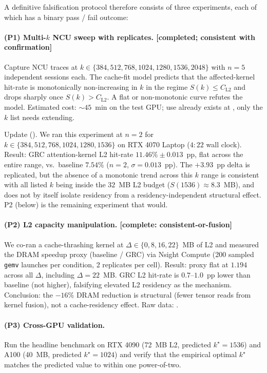 \documentclass[11pt]{article}
\begin{document}
A definitive falsification protocol therefore consists of three
experiments, each of which has a binary pass / fail outcome:

\paragraph{(P1) Multi-$k$ NCU sweep with replicates. [completed; consistent with confirmation]}
Capture NCU traces at $k\in\{384, 512, 768, 1024, 1280, 1536, 2048\}$
with $n{=}5$ independent sessions each. The cache-fit model predicts
that the affected-kernel hit-rate is monotonically non-increasing in $k$
in the regime $S(k)\le C_\text{L2}$ and drops sharply once
$S(k)>C_\text{L2}$. A flat or non-monotonic curve refutes the model.
Estimated cost: ${\sim}45$~min on the test GPU; use already exists at
, only the $k$ list needs
extending.

\smallskip\noindent Update ().
We ran this experiment at $n{=}2$ for $k\in\{384,512,768,1024,1280,1536\}$
on RTX 4070 Laptop ($4{:}22$ wall clock). Result: GRC attention-kernel
L2 hit-rate $11.46\%\pm 0.013$~pp, flat across the entire range, vs.\
baseline $7.54\%$ ($n{=}2$, $\sigma{=}0.013$~pp). The $+3.93$~pp delta
is replicated, but the absence of a monotonic trend across this $k$ range
is consistent with all listed $k$ being inside the $32$~MB L2 budget
($S(1536)\approx 8.3$~MB), and does not by itself isolate residency
from a residency-independent structural effect. P2 (below) is the
remaining experiment that would.

\paragraph{(P2) L2 capacity manipulation. [complete: consistent-or-fusion]}
We co-ran a cache-thrashing kernel at $\Delta\in\{0, 8, 16, 22\}$~MB of
L2 and measured the DRAM speedup proxy (baseline / GRC) via Nsight Compute
(200 sampled \texttt{gemv} launches per condition, 2 replicates per cell).
Result: proxy flat at $1.194$ across all $\Delta$, including $\Delta{=}22$~MB.
GRC L2 hit-rate is $0.7$--$1.0$~pp lower than baseline (not higher),
falsifying elevated L2 residency as the mechanism.
Conclusion: the $-16\%$ DRAM reduction is structural (fewer tensor reads
from kernel fusion), not a cache-residency effect.
Raw data: .

\paragraph{(P3) Cross-GPU validation.}
Run the headline benchmark on RTX 4090 (72~MB L2, predicted
$k^\star{=}1536$) and A100 (40~MB, predicted $k^\star{=}1024$) and
verify that the empirical optimal $k^\star$ matches the predicted
value to within one power-of-two.
\end{document}
